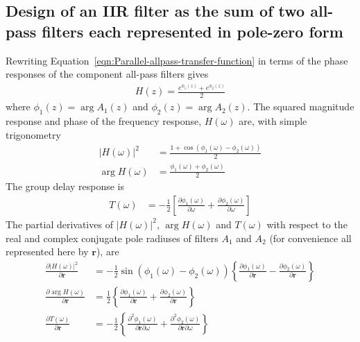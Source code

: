 \documentclass[a4paper,twoside,10pt,english]{report}
\begin{document}
\subsection{\label{sec:Design-IIR-filter-sum-all-pass filters-pole-zero}Design of an IIR filter as the sum of two all-pass filters each represented in pole-zero form}
Rewriting Equation~\ref{eqn:Parallel-allpass-transfer-function} in terms of
the phase responses of the component all-pass filters gives
\begin{align*}
  H\left(z\right)=\frac{e^{\phi_{1}\left(z\right)}+e^{\phi_{2}\left(z\right)}}{2}
\end{align*}
where $\phi_{1}\left(z\right)=\arg A_{1}\left(z\right)$ and 
$\phi_{2}\left(z\right)=\arg A_{2}\left(z\right)$. The squared magnitude
response and phase of the frequency response, $H\left(\omega\right)$ are, 
with simple trigonometry
\begin{align*}
\left|H\left(\omega\right)\right|^{2} &=
\frac{1+\cos\left(\phi_{1}\left(\omega\right)-
                  \phi_{2}\left(\omega\right)\right)}{2}\\
\arg H\left(\omega\right) &=
\frac{\phi_{1}\left(\omega\right)+\phi_{2}\left(\omega\right)}{2}
\end{align*}
The group delay response is
\begin{align*}
T\left(\omega\right) &= 
-\frac{1}{2}\left[
\frac{\partial\phi_{1}\left(\omega\right)}{\partial\omega}+
\frac{\partial\phi_{2}\left(\omega\right)}{\partial\omega}
\right]
\end{align*}
The partial derivatives of $\left|H\left(\omega\right)\right|^{2}$,
$\arg H\left(\omega\right)$ and $T\left(\omega\right)$ with respect to the 
real and complex conjugate pole radiuses of filters $A_{1}$ and $A_{2}$ 
(for convenience all represented here by $\boldsymbol{r}$), are
\begin{align*}
\frac{\partial \left|H\left(\omega\right)\right|^{2}}{\partial\boldsymbol{r}} &=
  -\frac{1}{2}\sin\left(\phi_{1}\left(\omega\right)-
                        \phi_{2}\left(\omega\right)\right)\left\{
  \frac{\partial\phi_{1}\left(\omega\right)}{\partial\boldsymbol{r}}-
  \frac{\partial\phi_{2}\left(\omega\right)}{\partial\boldsymbol{r}}\right\} \\
\frac{\partial \arg H\left(\omega\right)}{\partial\boldsymbol{r}} &=
  \frac{1}{2}\left\{
  \frac{\partial\phi_{1}\left(\omega\right)}{\partial\boldsymbol{r}}+
  \frac{\partial\phi_{2}\left(\omega\right)}{\partial\boldsymbol{r}}\right\}\\
\frac{\partial T\left(\omega\right)}{\partial\boldsymbol{r}} &=
-\frac{1}{2}\left\{\frac{\partial^{2}\phi_{1}\left(\omega\right)}
                        {\partial\boldsymbol{r}\partial\omega} +
                   \frac{\partial^{2}\phi_{2}\left(\omega\right)}
                        {\partial\boldsymbol{r}\partial\omega}\right\}
\end{align*}
\end{document}
